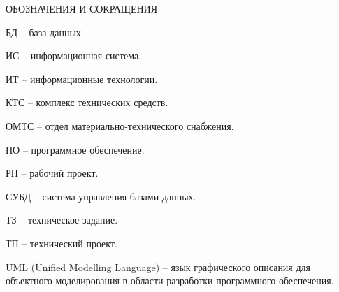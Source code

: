 \newpage
\begin{center}ОБОЗНАЧЕНИЯ И СОКРАЩЕНИЯ\end{center}


БД – база данных.

ИС – информационная система.

ИТ – информационные технологии. 

КТС – комплекс технических средств.

ОМТС – отдел материально-технического снабжения. 

ПО – программное обеспечение.

РП – рабочий проект.

СУБД – система управления базами данных.

ТЗ – техническое задание.

ТП – технический проект.

UML (Unified Modelling Language) – язык графического описания для объектного моделирования в области разработки программного обеспечения.
